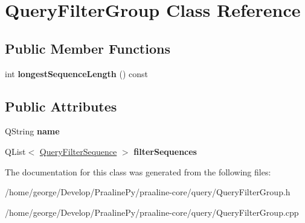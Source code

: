 \hypertarget{class_query_filter_group}{}\section{Query\+Filter\+Group Class Reference}
\label{class_query_filter_group}
\subsection*{Public Member Functions}
\begin{DoxyCompactItemize}
\item 
\mbox{\label{class_query_filter_group_a9a341c4da67579ad7da66114737d6855}} 
int {\bfseries longest\+Sequence\+Length} () const
\end{DoxyCompactItemize}
\subsection*{Public Attributes}
\begin{DoxyCompactItemize}
\item 
\mbox{\label{class_query_filter_group_a4dbbc8746f5255ba900380a866dbbd6e}} 
Q\+String {\bfseries name}
\item 
\mbox{\label{class_query_filter_group_af40d201b92dc9e77adc6381dbc160f29}} 
Q\+List$<$ \hyperlink{class_query_filter_sequence}{Query\+Filter\+Sequence} $>$ {\bfseries filter\+Sequences}
\end{DoxyCompactItemize}


The documentation for this class was generated from the following files\+:\begin{DoxyCompactItemize}
\item 
/home/george/\+Develop/\+Praaline\+Py/praaline-\/core/query/Query\+Filter\+Group.\+h\item 
/home/george/\+Develop/\+Praaline\+Py/praaline-\/core/query/Query\+Filter\+Group.\+cpp\end{DoxyCompactItemize}
